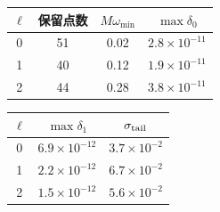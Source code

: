 \documentclass[UTF8,fontset=fandol,12pt,a4paper,oneside,openany]{ctexrep}
\begin{document}
\noindent\begin{minipage}{\linewidth}
\captionsetup{type=table}\caption{代表性谱尾、离网残差和能流误差。}\label{audit:tab:numerics}
\centering\fontsize{10.5}{14}\selectfont
\setlength{\tabcolsep}{6pt}\renewcommand{\arraystretch}{1.2}
\par{}\par\smallskip
\begin{tabular}{cccc}\toprule
$\ell$ & 保留点数 & $M\omega_{\min}$ & $\max\delta_0$\\\midrule
0 & 51 & 0.02 & $2.8\times10^{-11}$\\
1 & 40 & 0.12 & $1.9\times10^{-11}$\\
2 & 44 & 0.28 & $3.8\times10^{-11}$\\
\bottomrule\end{tabular}
\par\medskip
\par{}\par\smallskip
\begin{tabular}{ccc}\toprule
$\ell$ & $\max\delta_1$ & $\sigma_{\rm tail}$\\\midrule
0 & $6.9\times10^{-12}$ & $3.7\times10^{-2}$\\
1 & $2.2\times10^{-12}$ & $6.7\times10^{-2}$\\
2 & $1.5\times10^{-12}$ & $5.6\times10^{-2}$\\
\bottomrule\end{tabular}
\end{minipage}\par\addvspace{10pt}
\par\addvspace{14pt}
\end{document}
